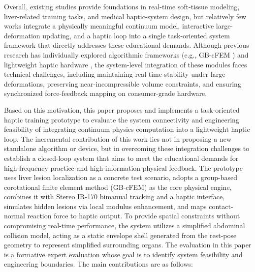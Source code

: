 \documentclass{ieeeaccess}
\begin{document}
Overall, existing studies provide foundations in real-time soft-tissue modeling, liver-related training tasks, and medical haptic-system design, but relatively few works integrate a physically meaningful continuum model, interactive large-deformation updating, and a haptic loop into a single task-oriented system framework that directly addresses these educational demands. Although previous research has individually explored algorithmic frameworks (e.g., GB-cFEM \cite{wang2025group}) and lightweight haptic hardware \cite{xu2025lightweight}, the system-level integration of these modules faces technical challenges, including maintaining real-time stability under large deformations, preserving near-incompressible volume constraints, and ensuring synchronized force-feedback mapping on consumer-grade hardware.

Based on this motivation, this paper proposes and implements a task-oriented haptic training prototype to evaluate the system connectivity and engineering feasibility of integrating continuum physics computation into a lightweight haptic loop. The incremental contribution of this work lies not in proposing a new standalone algorithm or device, but in overcoming these integration challenges to establish a closed-loop system that aims to meet the educational demands for high-frequency practice and high-information physical feedback. The prototype uses liver lesion localization as a concrete test scenario, adopts a group-based corotational finite element method (GB-cFEM) as the core physical engine, combines it with Stereo IR-170 bimanual tracking and a haptic interface, simulates hidden lesions via local modulus enhancement, and maps contact-normal reaction force to haptic output. To provide spatial constraints without compromising real-time performance, the system utilizes a simplified abdominal collision model, acting as a static envelope shell generated from the rest-pose geometry to represent simplified surrounding organs. The evaluation in this paper is a formative expert evaluation whose goal is to identify system feasibility and engineering boundaries. The main contributions are as follows:
\end{document}

